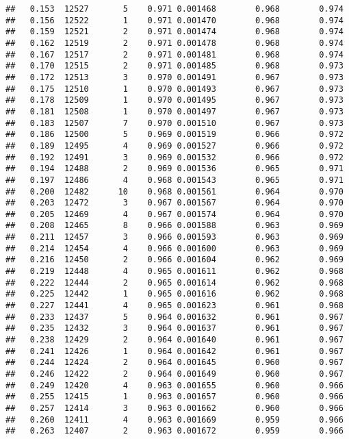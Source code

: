 \documentclass[
]{book}
\begin{document}
\begin{verbatim}
##   0.153  12527       5    0.971 0.001468        0.968        0.974
##   0.156  12522       1    0.971 0.001470        0.968        0.974
##   0.159  12521       2    0.971 0.001474        0.968        0.974
##   0.162  12519       2    0.971 0.001478        0.968        0.974
##   0.167  12517       2    0.971 0.001481        0.968        0.974
##   0.170  12515       2    0.971 0.001485        0.968        0.973
##   0.172  12513       3    0.970 0.001491        0.967        0.973
##   0.175  12510       1    0.970 0.001493        0.967        0.973
##   0.178  12509       1    0.970 0.001495        0.967        0.973
##   0.181  12508       1    0.970 0.001497        0.967        0.973
##   0.183  12507       7    0.970 0.001510        0.967        0.973
##   0.186  12500       5    0.969 0.001519        0.966        0.972
##   0.189  12495       4    0.969 0.001527        0.966        0.972
##   0.192  12491       3    0.969 0.001532        0.966        0.972
##   0.194  12488       2    0.969 0.001536        0.965        0.971
##   0.197  12486       4    0.968 0.001543        0.965        0.971
##   0.200  12482      10    0.968 0.001561        0.964        0.970
##   0.203  12472       3    0.967 0.001567        0.964        0.970
##   0.205  12469       4    0.967 0.001574        0.964        0.970
##   0.208  12465       8    0.966 0.001588        0.963        0.969
##   0.211  12457       3    0.966 0.001593        0.963        0.969
##   0.214  12454       4    0.966 0.001600        0.963        0.969
##   0.216  12450       2    0.966 0.001604        0.962        0.969
##   0.219  12448       4    0.965 0.001611        0.962        0.968
##   0.222  12444       2    0.965 0.001614        0.962        0.968
##   0.225  12442       1    0.965 0.001616        0.962        0.968
##   0.227  12441       4    0.965 0.001623        0.961        0.968
##   0.233  12437       5    0.964 0.001632        0.961        0.967
##   0.235  12432       3    0.964 0.001637        0.961        0.967
##   0.238  12429       2    0.964 0.001640        0.961        0.967
##   0.241  12426       1    0.964 0.001642        0.961        0.967
##   0.244  12424       2    0.964 0.001645        0.960        0.967
##   0.246  12422       2    0.964 0.001649        0.960        0.967
##   0.249  12420       4    0.963 0.001655        0.960        0.966
##   0.255  12415       1    0.963 0.001657        0.960        0.966
##   0.257  12414       3    0.963 0.001662        0.960        0.966
##   0.260  12411       4    0.963 0.001669        0.959        0.966
##   0.263  12407       2    0.963 0.001672        0.959        0.966

\end{verbatim}
\end{document}
